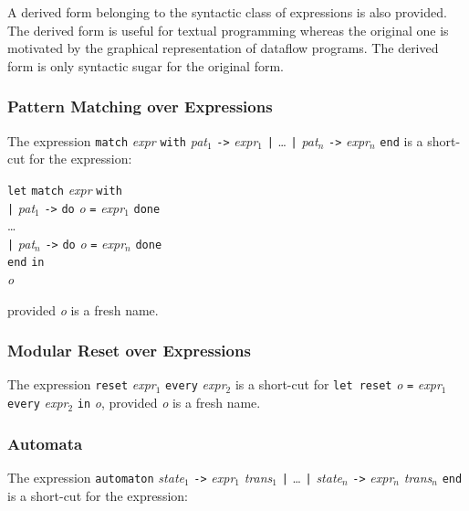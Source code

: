\documentclass[11pt,titlepage,twoside]{report}
\newcommand{\In}{\mbox{{\tt in}}}
\newcommand{\Minusgreater}{\mbox{{\tt ->}}}
\newcommand{\term}[1]{{\tt #1}}
\newcommand{\nterm}[1]{{\em #1}}
\begin{document}
A derived form belonging to the syntactic class of expressions is also
provided. The derived form is useful for textual programming whereas
the original one is motivated by the graphical representation of
dataflow programs. The derived form is only syntactic sugar for the
original form.

\subsubsection{Pattern Matching over Expressions}
The expression
\term{match} \nterm{expr} \term{with} 
  \nterm{pat}$_1$ \term{\Minusgreater} \nterm{expr}$_1$ \term{|} \dots 
\term{|} \nterm{pat}$_n$ \term{\Minusgreater} \nterm{expr}$_n$ \term{end}
is a short-cut for the expression:

\begin{center}
\begin{tabbing}
\term{let} \= \term{match} \nterm{expr} \term{with} \\ 
           \> \term{|} \nterm{pat}$_1$ \term{\Minusgreater} 
               \term{do} \nterm{o} \term{=} \nterm{expr}$_1$ \term{done} \\
           \> \dots \\
           \> \term{|} \nterm{pat}$_n$ \term{\Minusgreater} 
               \term{do} \nterm{o} \term{=} \nterm{expr}$_n$ \term{done} \\
           \> \term{end} \In \\
\nterm{o}
\end{tabbing}
\end{center}
provided \nterm{o} is a fresh name.

\subsubsection{Modular Reset over Expressions}
The expression \term{reset} \nterm{expr}$_1$ \term{every} \nterm{expr}$_2$
is a short-cut for
\term{let reset} \nterm{o} \term{=} \nterm{expr}$_1$ 
\term{every} \nterm{expr}$_2$ \term{in} \nterm{o},
provided \nterm{o} is a fresh name.

\subsubsection{Automata}
The expression 
\term{automaton} \nterm{state}$_1$ \term{\Minusgreater} \nterm{expr}$_1$ 
                 \nterm{trans}$_1$ 
\term{|} \dots
\term{|} \nterm{state}$_n$ \term{\Minusgreater} \nterm{expr}$_n$ 
                 \nterm{trans}$_n$ \term{end} is a short-cut
for the expression:
\end{document}
